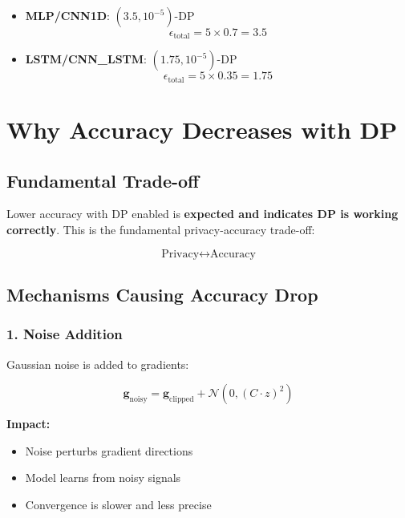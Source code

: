 \documentclass[12pt,a4paper]{article}
\begin{document}
\begin{itemize}
    \item \textbf{MLP/CNN1D}: $(3.5, 10^{-5})$-DP
    \begin{equation}
    \epsilon_{\text{total}} = 5 \times 0.7 = 3.5
    \end{equation}
    
    \item \textbf{LSTM/CNN\_LSTM}: $(1.75, 10^{-5})$-DP
    \begin{equation}
    \epsilon_{\text{total}} = 5 \times 0.35 = 1.75
    \end{equation}
\end{itemize}

\section{Why Accuracy Decreases with DP}

\subsection{Fundamental Trade-off}

Lower accuracy with DP enabled is \textbf{expected and indicates DP is working correctly}. This is the fundamental privacy-accuracy trade-off:

\begin{equation}
\text{Privacy} \leftrightarrow \text{Accuracy}
\end{equation}

\subsection{Mechanisms Causing Accuracy Drop}

\subsubsection{1. Noise Addition}

Gaussian noise is added to gradients:

\begin{equation}
\mathbf{g}_{\text{noisy}} = \mathbf{g}_{\text{clipped}} + \mathcal{N}(0, (C \cdot z)^2)
\end{equation}

\textbf{Impact:}
\begin{itemize}
    \item Noise perturbs gradient directions
    \item Model learns from noisy signals
    \item Convergence is slower and less precise
\end{itemize}
\end{document}
